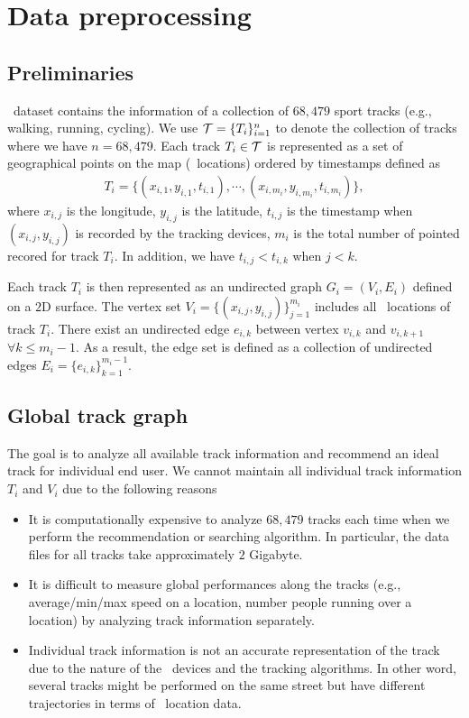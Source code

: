 
\section{Data preprocessing}

\subsection{Preliminaries}

\edmd\ dataset contains the information of a collection of $68,479$ sport tracks (e.g., walking, running, cycling).
We use $\mathcal{T}=\{T_i\}_{i=1}^n$ to denote the collection of tracks where we have $n=68,479$.
Each track $T_i\in\mathcal{T}$ is represented as a set of geographical points on the map (\gps\ locations) ordered by timestamps defined as
\begin{align*}
	T_i = \{(x_{i,1},y_{i,1},t_{i,1}),\cdots,(x_{i,m_i},y_{i,m_i},t_{i,m_i})\},
\end{align*}
where $x_{i,j}$ is the longitude, $y_{i,j}$ is the latitude, $t_{i,j}$ is the timestamp when $(x_{i,j},y_{i,j})$ is recorded by the tracking devices, $m_i$ is the total number of pointed recored for track $T_i$.
In addition, we have $t_{i,j}<t_{i,k}$ when $j<k$.

Each track $T_i$ is then represented as an undirected graph $G_i = (V_i,E_i)$ defined on a $2$D surface.
The vertex set $V_i=\{(x_{i,j},y_{i,j})\}_{j=1}^{m_i}$ includes all \gps\ locations of track $T_i$.
There exist an undirected edge $e_{i,k}$ between vertex $v_{i,k}$ and $v_{i,k+1}$ $\forall k\le m_i-1$.
As a result, the edge set is defined as a collection of undirected edges $E_i = \{e_{i,k}\}_{k=1}^{m_i-1}$.

\subsection{Global track graph}

The goal is to analyze all available track information and recommend an ideal track for individual end user.
We cannot maintain all individual track information $T_i$ and $V_i$ due to the following reasons
\begin{itemize}
	\item It is computationally expensive to analyze $68,479$ tracks each time when we perform the recommendation or searching algorithm. In particular, the data files for all tracks take approximately $2$ Gigabyte.
	\item It is difficult to measure global performances along the tracks (e.g., average/min/max speed on a location, number people running over a location) by analyzing track information separately. 
	\item Individual track information is not an accurate representation of the track due to the nature of the \gps\ devices and the tracking algorithms. In other word, several tracks might be performed on the same street but have different trajectories in terms of \gps\ location data. 
\end{itemize} 

